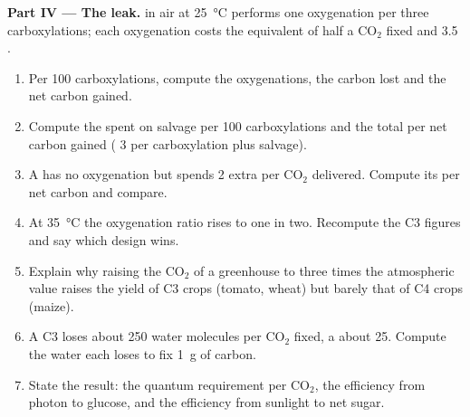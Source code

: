 \begin{problem}
\medskip
\noindent\textbf{Part IV --- The leak.}
 in air at \qty{25}{\celsius} performs one oxygenation per three
carboxylations; each oxygenation costs the equivalent of half a
$\mathrm{CO_2}$ fixed and 3.5 .
\begin{enumerate}[resume]
  \item Per 100 carboxylations, compute the oxygenations, the carbon
        lost and the net carbon gained.
  \item Compute the  spent on salvage per 100 carboxylations and
        the total  per net carbon gained ( 3  per
        carboxylation plus salvage).
  \item A  has no oxygenation but spends 2 extra  per
        $\mathrm{CO_2}$ delivered. Compute its  per net carbon and
        compare.
  \item At \qty{35}{\celsius} the oxygenation ratio rises to one in
        two. Recompute the C3 figures and say which design wins.
  \item Explain why raising the $\mathrm{CO_2}$ of a greenhouse to
        three times the atmospheric value raises the yield of C3
        crops (tomato, wheat) but barely that of C4 crops (maize).
  \item A C3  loses about 250 water molecules per $\mathrm{CO_2}$
        fixed, a  about 25. Compute the water each loses to
        fix \qty{1}{g} of carbon.
  \item State the result: the quantum requirement per $\mathrm{CO_2}$,
        the efficiency from photon to glucose, and the efficiency from
        sunlight to net  sugar.
\end{enumerate}
\end{problem}
